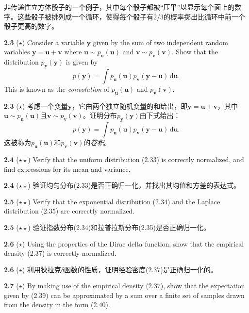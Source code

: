 \documentclass{article}
\begin{document}
非传递性立方体骰子的一个例子，其中每个骰子都被“压平”以显示每个面上的数字。这些骰子被排列成一个循环，使得每个骰子有2/3的概率掷出比循环中前一个骰子更高的数字。

\textbf{2.3} ($\star$) Consider a variable $\mathbf{y}$ given by the sum of two independent random variables $\mathbf{y} = \mathbf{u} + \mathbf{v}$ where $\mathbf{u} \sim p_{\mathbf{u}}(\mathbf{u})$ and $\mathbf{v} \sim p_{\mathbf{v}}(\mathbf{v})$. Show that the distribution $p_{\mathbf{y}}(\mathbf{y})$ is given by
\begin{equation}
p(\mathbf{y}) = \int p_{\mathbf{u}}(\mathbf{u})p_{\mathbf{v}}(\mathbf{y} - \mathbf{u}) \,\mathrm{d}\mathbf{u}. \tag{2.119}
\end{equation}
This is known as the \emph{convolution} of $p_{\mathbf{u}}(\mathbf{u})$ and $p_{\mathbf{v}}(\mathbf{v})$.

\textbf{2.3} ($\star$) 考虑一个变量$\mathbf{y}$，它由两个独立随机变量的和给出，即$\mathbf{y} = \mathbf{u} + \mathbf{v}$，其中$\mathbf{u} \sim p_{\mathbf{u}}(\mathbf{u})$且$\mathbf{v} \sim p_{\mathbf{v}}(\mathbf{v})$。证明分布$p_{\mathbf{y}}(\mathbf{y})$由下式给出：
\begin{equation}
p(\mathbf{y}) = \int p_{\mathbf{u}}(\mathbf{u})p_{\mathbf{v}}(\mathbf{y} - \mathbf{u}) \,\mathrm{d}\mathbf{u}. \tag{2.119}
\end{equation}
这被称为$p_{\mathbf{u}}(\mathbf{u})$和$p_{\mathbf{v}}(\mathbf{v})$的\emph{卷积}。

\textbf{2.4} ($\star\star$) Verify that the uniform distribution (2.33) is correctly normalized, and find expressions for its mean and variance.

\textbf{2.4} ($\star\star$) 验证均匀分布(2.33)是否正确归一化，并找出其均值和方差的表达式。

\textbf{2.5} ($\star\star$) Verify that the exponential distribution (2.34) and the Laplace distribution (2.35) are correctly normalized.

\textbf{2.5} ($\star\star$) 验证指数分布(2.34)和拉普拉斯分布(2.35)是否正确归一化。

\textbf{2.6} ($\star$) Using the properties of the Dirac delta function, show that the empirical density (2.37) is correctly normalized.

\textbf{2.6} ($\star$) 利用狄拉克$\delta$函数的性质，证明经验密度(2.37)是正确归一化的。

\textbf{2.7} ($\star$) By making use of the empirical density (2.37), show that the expectation given by (2.39) can be approximated by a sum over a finite set of samples drawn from the density in the form (2.40).
\end{document}
